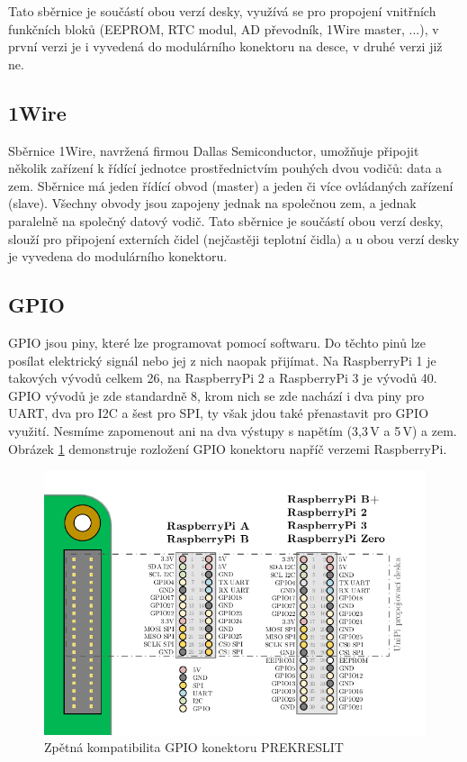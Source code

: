 Tato sběrnice je součástí obou verzí desky, využívá se pro propojení vnitřních funkčních bloků (EEPROM, RTC modul, AD převodník, 1Wire master, ...), v první verzi je i vyvedená do modulárního konektoru na desce, v druhé verzi již ne.

\subsection{1Wire}
Sběrnice 1Wire, navržená firmou Dallas Semiconductor, umožňuje připojit několik zařízení k řídící jednotce prostřednictvím pouhých dvou vodičů: data a zem. Sběrnice má jeden řídící obvod (master) a jeden či více ovládaných zařízení (slave). Všechny obvody jsou zapojeny jednak na společnou zem, a jednak paralelně na společný datový vodič. Tato sběrnice je součástí obou verzí desky, slouží pro připojení externích čidel (nejčastěji teplotní čidla) a u obou verzí desky je vyvedena do modulárního konektoru.

\subsection{GPIO}
\label{KapGPIO}
GPIO jsou piny, které lze programovat pomocí softwaru. Do těchto pinů lze posílat elektrický signál nebo jej z nich naopak přijímat. Na RaspberryPi 1 je takových vývodů celkem 26, na RaspberryPi 2 a RaspberryPi 3 je vývodů 40. GPIO vývodů je zde standardně 8, krom nich se zde nachází i dva piny pro UART, dva pro I2C a šest pro SPI, ty však jdou také přenastavit pro GPIO využití. Nesmíme zapomenout ani na dva výstupy s napětím (3,3\,V a 5\,V) a zem.
Obrázek \ref{ObrazekGPIO} demonstruje rozložení GPIO konektoru napříč verzemi RaspberryPi.

\begin{figure}[!ht]
  \begin{center}
    \includegraphics[scale=0.6]{obrazky/unipi_gpio}
  \end{center}
  \caption{Zpětná kompatibilita GPIO konektoru \cite{SberniceGPIO} \colorbox[rgb]{1,0,0}{PREKRESLIT}}
	\label{ObrazekGPIO}
\end{figure}

